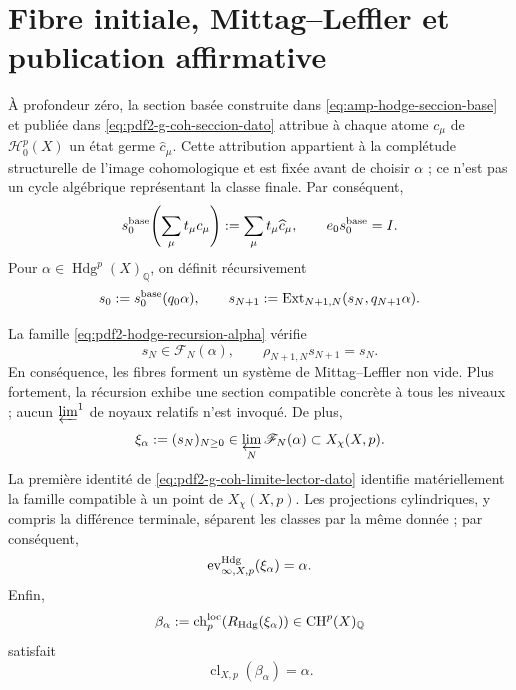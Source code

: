 \section{Fibre initiale, Mittag--Leffler et publication affirmative}

À profondeur zéro, la section basée construite dans
\eqref{eq:amp-hodge-seccion-base} et publiée dans
\eqref{eq:pdf2-g-coh-seccion-dato} attribue à chaque atome $c_\mu$ de
$\mathscr H_0^p(X)$ un état germe $\widehat c_\mu$. Cette attribution
appartient à la complétude structurelle de l'image cohomologique et est fixée
avant de choisir $\alpha$ ; ce n'est pas un cycle algébrique représentant la
classe finale. Par conséquent,
\begin{equation}\label{eq:pdf2-hodge-seccion-base}
 s_0^{\rm base}\!\left(\sum_\mu t_\mu c_\mu\right)
 :=\sum_\mu t_\mu\widehat c_\mu,
 \qquad e_0s_0^{\rm base}=I.
\end{equation}
Pour $\alpha\in\operatorname{Hdg}^p(X)_{\mathbb Q}$, on définit
récursivement
\begin{equation}\label{eq:pdf2-hodge-recursion-alpha}
 s_0:=s_0^{\rm base}(q_0\alpha),
 \qquad
 s_{N+1}:=\operatorname{Ext}_{N+1,N}(s_N,q_{N+1}\alpha).
\end{equation}

\begin{theorem}
\label{thm:pdf2-hodge-completitud-final}
La famille \eqref{eq:pdf2-hodge-recursion-alpha} vérifie
\[
 s_N\in\mathscr F_N(\alpha),
 \qquad \rho_{N+1,N}s_{N+1}=s_N.
\]
En conséquence, les fibres forment un système de Mittag--Leffler non vide. Plus
fortement, la récursion exhibe une section compatible concrète à tous les
niveaux ; aucun \(\varprojlim^1\) de noyaux relatifs n'est invoqué. De plus,
\begin{equation}\label{eq:pdf2-hodge-xi-alpha}
 \xi_\alpha:=(s_N)_{N\ge0}
 \in\varprojlim_N\mathscr F_N(\alpha)\subset X_\chi(X,p).
\end{equation}
La première identité de \eqref{eq:pdf2-g-coh-limite-lector-dato} identifie
matériellement la famille compatible à un point de $X_\chi(X,p)$. Les
projections cylindriques, y compris la différence terminale, séparent les classes par
la même donnée ; par conséquent,
\begin{equation}\label{eq:pdf2-hodge-evaluacion-alpha}
 \operatorname{ev}^{\rm Hdg}_{\infty,X,p}(\xi_\alpha)=\alpha.
\end{equation}
Enfin,
\begin{equation}\label{eq:pdf2-hodge-beta}
 \beta_\alpha:=\operatorname{ch}^{\rm loc}_p
 (R_{\rm Hdg}(\xi_\alpha))\in\operatorname{CH}^p(X)_{\mathbb Q}
\end{equation}
satisfait
\begin{equation}\label{eq:pdf2-hodge-clase-final}
 \operatorname{cl}_{X,p}(\beta_\alpha)=\alpha.
\end{equation}
\end{theorem}

